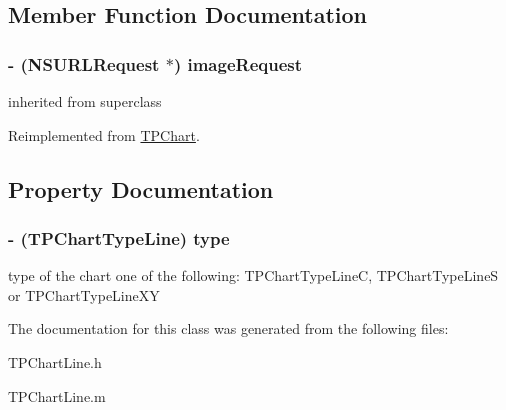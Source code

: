 \subsection{Member Function Documentation}
\hypertarget{interface_t_p_chart_line_2fa4ce27ed67bce0c2d0d2a9b41c026c}{
\subsubsection[{imageRequest}]{\setlength{\rightskip}{0pt plus 5cm}- (NSURLRequest $\ast$) imageRequest }}
\label{interface_t_p_chart_line_2fa4ce27ed67bce0c2d0d2a9b41c026c}


inherited from superclass 

Reimplemented from \hyperlink{interface_t_p_chart_34d673557c84b693e02cd5fe587b9c6f}{TPChart}.

\subsection{Property Documentation}
\hypertarget{interface_t_p_chart_line_04e85b606d425d8329ea5f9b0ec0f50f}{
\subsubsection[{type}]{\setlength{\rightskip}{0pt plus 5cm}- (TPChartTypeLine) type}}
\label{interface_t_p_chart_line_04e85b606d425d8329ea5f9b0ec0f50f}


type of the chart one of the following: TPChartTypeLineC, TPChartTypeLineS or TPChartTypeLineXY 

The documentation for this class was generated from the following files:\begin{CompactItemize}
\item 
TPChartLine.h\item 
TPChartLine.m\end{CompactItemize}
